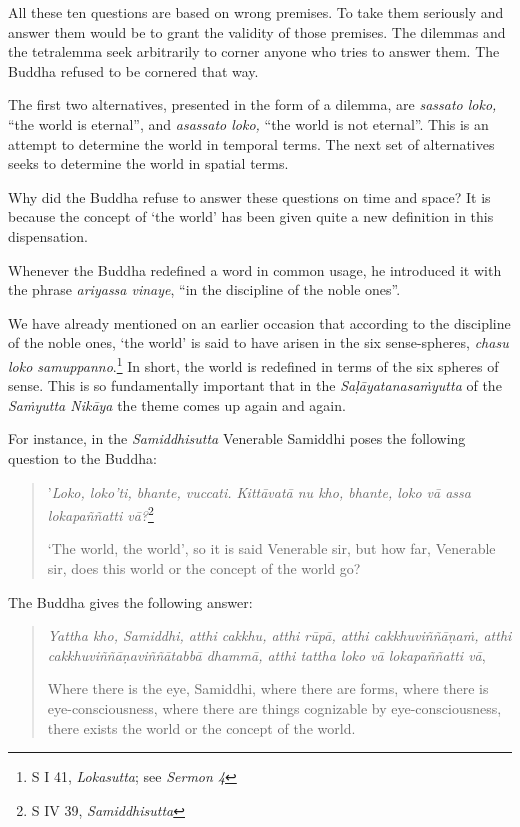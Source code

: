 All these ten questions are based on wrong premises. To take them seriously and answer them would be to grant the validity of those premises. The dilemmas and the tetralemma seek arbitrarily to corner anyone who tries to answer them. The Buddha refused to be cornered that way.

The first two alternatives, presented in the form of a dilemma, are \emph{sassato loko,} ``the world is eternal'', and \emph{asassato loko,} ``the world is not eternal''. This is an attempt to determine the world in temporal terms. The next set of alternatives seeks to determine the world in spatial terms.

Why did the Buddha refuse to answer these questions on time and space? It is because the concept of `the world' has been given quite a new definition in this dispensation.

Whenever the Buddha redefined a word in common usage, he introduced it with the phrase \emph{ariyassa vinaye}, ``in the discipline of the noble ones''.

We have already mentioned on an earlier occasion that according to the discipline of the noble ones, `the world' is said to have arisen in the six sense-spheres, \emph{chasu loko samuppanno}.\footnote{S I 41, \emph{Lokasutta}; see \emph{Sermon 4}} In short, the world is redefined in terms of the six spheres of sense. This is so fundamentally important that in the \emph{Saḷāyatanasaṁyutta} of the \emph{Saṁyutta Nikāya} the theme comes up again and again.

For instance, in the \emph{Samiddhisutta} Venerable Samiddhi poses the following question to the Buddha:

\begin{quote}
'\emph{Loko, loko'ti, bhante, vuccati. Kittāvatā nu kho, bhante, loko vā assa lokapaññatti vā?}\footnote{S IV 39, \emph{Samiddhisutta}}

`The world, the world', so it is said Venerable sir, but how far, Venerable sir, does this world or the concept of the world go?
\end{quote}

The Buddha gives the following answer:

\begin{quote}
\emph{Yattha kho, Samiddhi, atthi cakkhu, atthi rūpā, atthi cakkhuviññāṇaṁ, atthi cakkhuviññāṇaviññātabbā dhammā, atthi tattha loko vā lokapaññatti vā},

Where there is the eye, Samiddhi, where there are forms, where there is eye-consciousness, where there are things cognizable by eye-consciousness, there exists the world or the concept of the world.
\end{quote}

